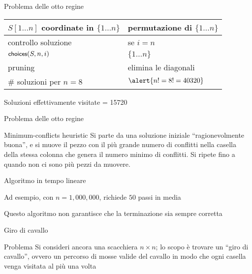 \begin{frame}{Problema delle otto regine}


\medskip
\begin{tabular}{|P{4cm}|P{7.1cm}|}
\hline
$S[1 \ldots n]$ coordinate in $\{ 1 \ldots n \}$	&	permutazione di $\{ 1 \ldots n \}$ \\\hline
controllo soluzione	& se $i = n$ \\\hline
$\textsf{{\small choices}}(S, n, i)$	&	$\{ 1 \ldots n \}$ \\\hline
pruning	&	elimina le diagonali \\\hline
\# soluzioni per $n=8$ 	&		$\alert{n! = 8! = 40320}$\\\hline 
\end{tabular}

\smallskip
{}
\BI
\item Soluzioni effettivamente visitate = 15720
\EI

\end{frame}

\begin{frame}{Problema delle otto regine}

\begin{block}{Minimum-conflicts heuristic}
Si parte da una soluzione iniziale “ragionevolmente buona”, e si muove
il pezzo con il più grande numero di conflitti nella casella della stessa 
colonna che genera il numero minimo di conflitti. Si ripete fino a quando non ci
sono più pezzi da muovere.
\end{block}
	
\BI
\item Algoritmo in tempo lineare
\item Ad esempio, con $n=1,000,000$, richiede $50$ passi in media
\item Questo algoritmo non garantisce che la terminazione sia sempre corretta	
\EI

\end{frame}

\begin{frame}{Giro di cavallo}

\vspace{-6pt}
\begin{block}{Problema}
 Si consideri ancora una scacchiera $n \times n$; lo scopo è trovare un “giro di
cavallo”, ovvero un percorso di mosse valide del cavallo in modo che ogni
casella venga visitata al più una volta
\end{block}

\end{frame}

